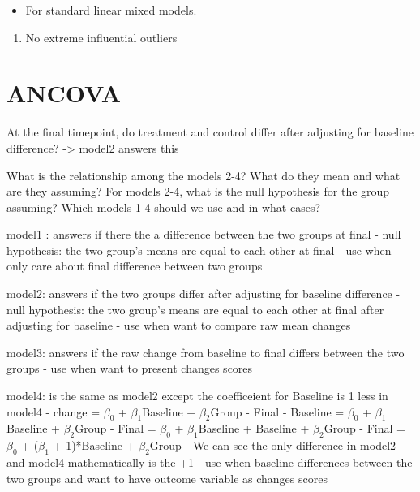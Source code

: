 \documentclass[
]{article}
\providecommand{\tightlist}{%
  \setlength{\itemsep}{0pt}\setlength{\parskip}{0pt}}
\begin{document}
\begin{itemize}
\tightlist
\item
  For standard linear mixed models.
\end{itemize}

\begin{enumerate}
\def\labelenumi{\arabic{enumi}.}
\setcounter{enumi}{6}
\tightlist
\item
  No extreme influential outliers
\end{enumerate}

\section{ANCOVA}\label{ancova}

At the final timepoint, do treatment and control differ after adjusting
for baseline difference? -\textgreater{} model2 answers this

What is the relationship among the models 2-4? What do they mean and
what are they assuming? For models 2-4, what is the null hypothesis for
the group assuming? Which models 1-4 should we use and in what cases?

model1 : answers if there the a difference between the two groups at
final - null hypothesis: the two group's means are equal to each other
at final - use when only care about final difference between two groups

model2: answers if the two groups differ after adjusting for baseline
difference - null hypothesis: the two group's means are equal to each
other at final after adjusting for baseline - use when want to compare
raw mean changes

model3: answers if the raw change from baseline to final differs between
the two groups - use when want to present changes scores

model4: is the same as model2 except the coefficeient for Baseline is 1
less in model4 - change = \(\beta_0\) + \(\beta_1\)Baseline +
\(\beta_2\)Group - Final - Baseline = \(\beta_0\) + \(\beta_1\)Baseline
+ \(\beta_2\)Group - Final = \(\beta_0\) + \(\beta_1\)Baseline +
Baseline + \(\beta_2\)Group - Final = \(\beta_0\) + (\(\beta_1\) +
1)*Baseline + \(\beta_2\)Group - We can see the only difference in
model2 and model4 mathematically is the +1 - use when baseline
differences between the two groups and want to have outcome variable as
changes scores
\end{document}
